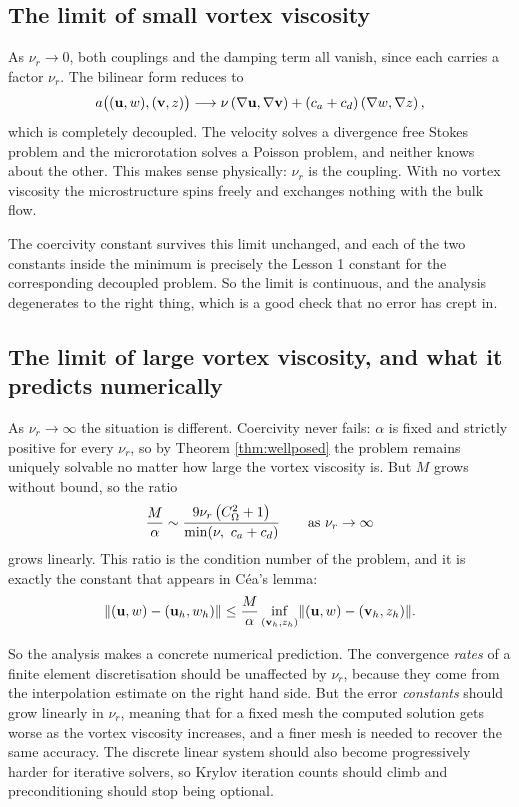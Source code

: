 \documentclass[11pt,a4paper]{article}
\begin{document}
\subsection{The limit of small vortex viscosity}

As $\nu_{r} \to 0$, both couplings and the damping term all vanish, since each
carries a factor $\nu_{r}$. The bilinear form reduces to
\[
  a\big( (\mathbf{u},w),(\mathbf{v},z) \big) \longrightarrow
  \nu \left( \nabla \mathbf{u} , \nabla \mathbf{v} \right) + (c_{a}+c_{d}) \left( \nabla w , \nabla z \right) ,
\]
which is completely decoupled. The velocity solves a divergence free Stokes
problem and the microrotation solves a Poisson problem, and neither knows about
the other. This makes sense physically: $\nu_{r}$ is the coupling. With no
vortex viscosity the microstructure spins freely and exchanges nothing with the
bulk flow.

The coercivity constant survives this limit unchanged, and each of the two
constants inside the minimum is precisely the Lesson 1 constant for the
corresponding decoupled problem. So the limit is continuous, and the analysis
degenerates to the right thing, which is a good check that no error has crept
in.

\subsection{The limit of large vortex viscosity, and what it predicts numerically}

As $\nu_{r} \to \infty$ the situation is different. Coercivity never fails:
$\alpha$ is fixed and strictly positive for every $\nu_{r}$, so by Theorem
\ref{thm:wellposed} the problem remains uniquely solvable no matter how large
the vortex viscosity is. But $M$ grows without bound, so the ratio
\[
  \frac{M}{\alpha} \sim \frac{9\nu_{r}\left( C_\Omega^{2}+1 \right)}
  {\min(\nu,\ c_{a}+c_{d})}
  \qquad \text{as } \nu_{r} \to \infty
\]
grows linearly. This ratio is the condition number of the problem, and it is
exactly the constant that appears in C\'ea's lemma:
\[
  \lVert (\mathbf{u},w) - (\mathbf{u}_{h},w_{h}) \rVert
  \le \frac{M}{\alpha}
  \inf_{(\mathbf{v}_{h},z_{h})} \lVert (\mathbf{u},w) - (\mathbf{v}_{h},z_{h}) \rVert .
\]

So the analysis makes a concrete numerical prediction. The convergence
\emph{rates} of a finite element discretisation should be unaffected by
$\nu_{r}$, because they come from the interpolation estimate on the right hand
side. But the error \emph{constants} should grow linearly in $\nu_{r}$, meaning
that for a fixed mesh the computed solution gets worse as the vortex viscosity
increases, and a finer mesh is needed to recover the same accuracy. The discrete
linear system should also become progressively harder for iterative solvers, so
Krylov iteration counts should climb and preconditioning should stop being
optional.
\end{document}
